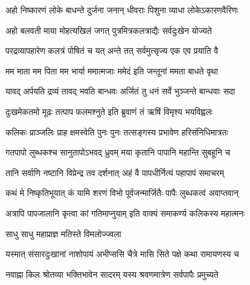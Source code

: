  

\twolineshloka
{अहो निष्कारणं लोके बाधन्ते दुर्जना जनान्}
{धीवराः पिशुना व्याधा लोकेऽकारणवैरिणः}%

 

\twolineshloka
{अहो बलवती माया मोहत्यखिलं जगत्}
{पुत्रमित्रकलत्राद्यैः सर्वदुःखेन योज्यते}%

 

\twolineshloka
{परद्रव्यापहारेण कलत्रं पोषितं च यत्}
{अन्ते तत् सर्वमुत्सृज्य एक एव प्रयाति वै}%

 

\twolineshloka
{मम माता मम पिता मम भार्या ममात्मजाः}
{ममेदं इति जन्तूनां ममता बाधते वृथा}%

 

\twolineshloka
{यावद् अर्पयति द्रव्यं तावद् भवति बान्धवः}
{अर्जितं तु धनं सर्वे भुञ्जन्ते बान्धवाः सदा}%

 

\twolineshloka
{दुःखमेकतमो मूढः तत्पाप फलमश्नुते}
{इति ब्रुवाणं तं ऋषिं विमृश्य भयविह्वलः}%

 

\twolineshloka
{कलिकः प्राञ्जलिः प्राह क्षमस्वेति पुनः पुनः}
{तत्सङ्‍गस्य प्रभावेण हरिसंनिधिमात्रतः}%

 

\twolineshloka
{गतपापो लुब्धकश्च सानुतापोऽभवद् ध्रुवम्}
{मया कृतानि पापानि महान्ति सुबहूनि च}%

 

\twolineshloka
{तानि सर्वाणि नष्टानि विप्रेन्द्र तव दर्शनात्}
{अहं वै पापधीर्नित्यं पहापापं समाचरम्}%

 

\twolineshloka
{कथं मे निष्कृतिभूयात् कं यामि शरणं विभो}
{पूर्वजन्मार्जितैः पापैः लुब्धकत्वं अवाप्तवान्}%

 

\twolineshloka
{अत्रापि पापजालानि कृत्वा कां गतिमाप्नुयाम्}
{इति वाक्यं समाकर्ण्य कलिकस्य महात्मनः}%

 


\onelineshloka
{साधु साधु महाप्राज्ञ मतिस्ते विमलोज्ज्वला}%

 

\twolineshloka
{यस्मात् संसारदुःखानां नाशोपायं अभीप्ससि}
{चैत्रे मासि सिते पक्षे कथा रामायणस्य च}%

 

\twolineshloka
{नवाह्ना किल श्रोतव्या भक्तिभावेन सादरम्}
{यस्य श्रवणमात्रेण सर्वपापैः प्रमुच्यते}%

